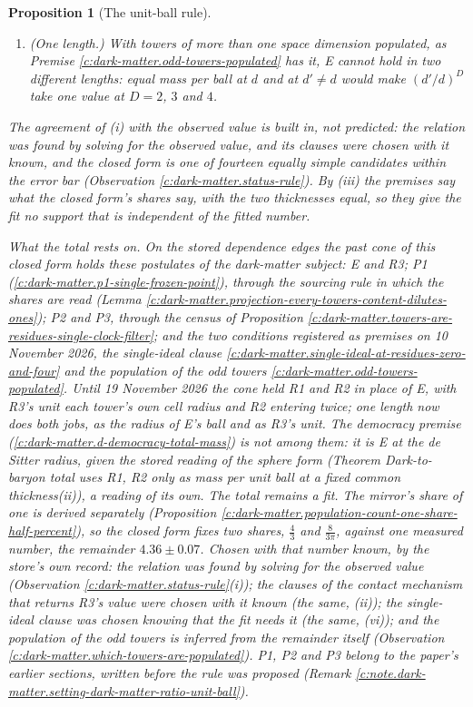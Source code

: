 \documentclass[11pt]{article}
\newtheorem{proposition}[theorem]{Proposition}
\theoremstyle{definition}
\theoremstyle{plain}
\begin{document}
\begin{proposition}[The unit-ball rule]
\begin{enumerate}
\item[(iv)] \emph{(One length.)} With towers of more than one space dimension populated, as Premise \ref{c:dark-matter.odd-towers-populated} has it, E cannot hold in two different lengths: equal mass per ball at $d$ and at $d' \neq d$ would make $(d'/d)^{D}$ take one value at $D = 2$, $3$ and $4$.
\end{enumerate}
The agreement of (i) with the observed value is built in, not predicted: the relation was found by solving for the observed value, and its clauses were chosen with it known, and the closed form is one of fourteen equally simple candidates within the error bar (Observation \ref{c:dark-matter.status-rule}). By (iii) the premises say what the closed form's shares say, with the two thicknesses equal, so they give the fit no support that is independent of the fitted number.

\emph{What the total rests on.} On the stored dependence edges the past cone of this closed form holds these postulates of the dark-matter subject: E and R3; P1 (\ref{c:dark-matter.p1-single-frozen-point}), through the sourcing rule in which the shares are read (Lemma \ref{c:dark-matter.projection-every-towers-content-dilutes-ones}); P2 and P3, through the census of Proposition \ref{c:dark-matter.towers-are-residues-single-clock-filter}; and the two conditions registered as premises on 10 November 2026, the single-ideal clause \ref{c:dark-matter.single-ideal-at-residues-zero-and-four} and the population of the odd towers \ref{c:dark-matter.odd-towers-populated}. Until 19 November 2026 the cone held R1 and R2 in place of E, with R3's unit each tower's own cell radius and R2 entering twice; one length now does both jobs, as the radius of E's ball and as R3's unit. The democracy premise (\ref{c:dark-matter.d-democracy-total-mass}) is not among them: it is E at the de Sitter radius, given the stored reading of the sphere form (Theorem \emph{Dark-to-baryon total uses R1, R2 only as mass per unit ball at a fixed common thickness}(ii)), a reading of its own. The total remains a fit. The mirror's share of one is derived separately (Proposition \ref{c:dark-matter.population-count-one-share-half-percent}), so the closed form fixes two shares, $\tfrac{4}{3}$ and $\tfrac{8}{3\pi}$, against one measured number, the remainder $4.36 \pm 0.07$. Chosen with that number known, by the store's own record: the relation was found by solving for the observed value (Observation \ref{c:dark-matter.status-rule}(i)); the clauses of the contact mechanism that returns R3's value were chosen with it known (the same, (ii)); the single-ideal clause was chosen knowing that the fit needs it (the same, (vi)); and the population of the odd towers is inferred from the remainder itself (Observation \ref{c:dark-matter.which-towers-are-populated}). P1, P2 and P3 belong to the paper's earlier sections, written before the rule was proposed (Remark \ref{c:note.dark-matter.setting-dark-matter-ratio-unit-ball}).
\end{proposition}
\end{document}
